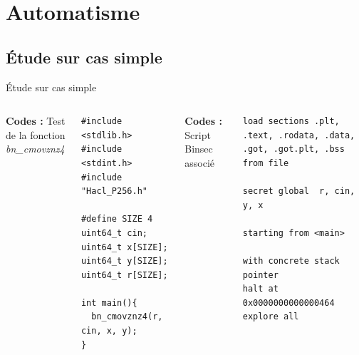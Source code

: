 \documentclass{backend/backend}
\begin{document}
\section{Automatisme}
\subsection{Étude sur cas simple}
\begin{frame}[fragile]{Étude sur cas simple}
\begin{columns}

  \textbf{Codes :} Test de la fonction \textit{bn\_cmovznz4}
    
  \begin{verbatim}
#include <stdlib.h>
#include <stdint.h>
#include "Hacl_P256.h"

#define SIZE 4
uint64_t cin;
uint64_t x[SIZE]; uint64_t y[SIZE]; uint64_t r[SIZE];

int main(){
  bn_cmovznz4(r, cin, x, y);
}
  \end{verbatim}


  \textbf{Codes :} Script Binsec associé
    
  \begin{verbatim}
load sections .plt, .text, .rodata, .data, .got, .got.plt, .bss from file

secret global  r, cin, y, x

starting from <main>

with concrete stack pointer
halt at  0x0000000000000464
explore all

  \end{verbatim}

\end{columns}
\end{frame}
\end{document}
